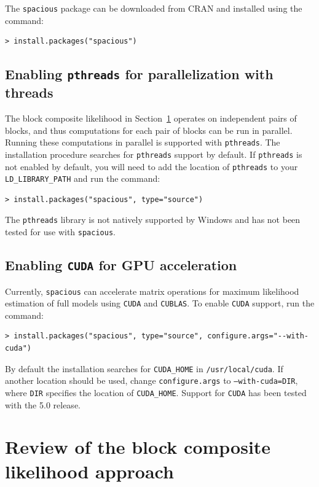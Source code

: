 \documentclass[11pt]{article}
\begin{document}
The {\tt spacious} package can be downloaded from CRAN and installed using the command:

\begin{verbatim}
> install.packages("spacious")
\end{verbatim}

\subsection{Enabling {\tt pthreads} for parallelization with threads}

The block composite likelihood in Section~\ref{s:review} operates on independent pairs of blocks, and thus computations for each pair of blocks can be run in parallel.
Running these computations in parallel is supported with {\tt pthreads}.
The installation procedure searches for {\tt pthreads} support by default.
If {\tt pthreads} is not enabled by default, you will need to add the location of {\tt pthreads} to your \verb|LD_LIBRARY_PATH| and run the command:

\begin{verbatim}
> install.packages("spacious", type="source")
\end{verbatim}
The {\tt pthreads} library is not natively supported by Windows and has not been tested for use with {\tt spacious}.

\subsection{Enabling {\tt CUDA} for GPU acceleration}

Currently, {\tt spacious} can accelerate matrix operations for maximum likelihood estimation of full models using {\tt CUDA} and {\tt CUBLAS}.
To enable {\tt CUDA} support, run the command:

\begin{verbatim}
> install.packages("spacious", type="source", configure.args="--with-cuda")
\end{verbatim}
By default the installation searches for \verb|CUDA_HOME| in {\tt /usr/local/cuda}.
If another location should be used, change {\tt configure.args} to {\tt --with-cuda=DIR}, where {\tt DIR} specifies the location of \verb|CUDA_HOME|.
Support for {\tt CUDA} has been tested with the 5.0 release.

\section{Review of the block composite likelihood approach}\label{s:review}
\end{document}

